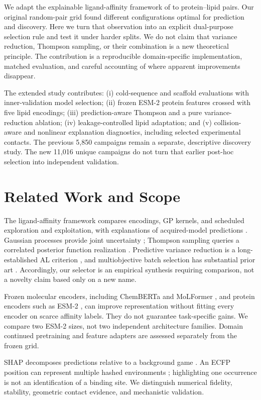\documentclass[wcp]{jmlr}
\begin{document}
We adapt the explainable ligand-affinity framework of
\citet{srivastava2026} to protein--lipid pairs. Our original random-pair grid
found different configurations optimal for prediction and discovery. Here we
turn that observation into an explicit dual-purpose selection rule and test
it under harder splits. We do not claim that variance reduction, Thompson
sampling, or their combination is a new theoretical principle. The contribution
is a reproducible domain-specific implementation, matched evaluation, and
careful accounting of where apparent improvements disappear.

The extended study contributes: (i) cold-sequence and scaffold evaluations
with inner-validation model selection; (ii) frozen ESM-2 protein features
crossed with five lipid encodings; (iii) prediction-aware Thompson and a pure
variance-reduction ablation; (iv) leakage-controlled lipid adaptation; and
(v) collision-aware and nonlinear explanation diagnostics, including selected
experimental contacts. The previous 5,850 campaigns remain a separate,
descriptive discovery study. The new 11,016 unique campaigns do not turn that
earlier post-hoc selection into independent validation.

\section{Related Work and Scope}
The ligand-affinity framework compares encodings, GP kernels, and scheduled
exploration and exploitation, with explanations of acquired-model predictions
\citep{srivastava2026}. Gaussian processes provide joint uncertainty
\citep{rasmussen2006}; Thompson sampling queries a correlated posterior
function realization \citep{russo2018}. Predictive variance reduction is a
long-established AL criterion \citep{cohn1996}, and multiobjective batch
selection has substantial prior art \citep{gupta2018}. Accordingly, our
selector is an empirical synthesis requiring comparison, not a novelty claim
based only on a new name.

Frozen molecular encoders, including ChemBERTa and MoLFormer
\citep{chemberta,ross2022}, and protein encoders such as ESM-2
\citep{esm}, can improve representation without fitting every encoder on
scarce affinity labels. They do not guarantee task-specific gains. We compare
two ESM-2 sizes, not two independent architecture families. Domain continued
pretraining and feature adapters are assessed separately from the frozen grid.

SHAP decomposes predictions relative to a background game
\citep{lundberg2017}. An ECFP position can represent multiple hashed
environments \citep{rogers2010}; highlighting one occurrence is not an
identification of a binding site. We distinguish numerical fidelity,
stability, geometric contact evidence, and mechanistic validation.
\end{document}
